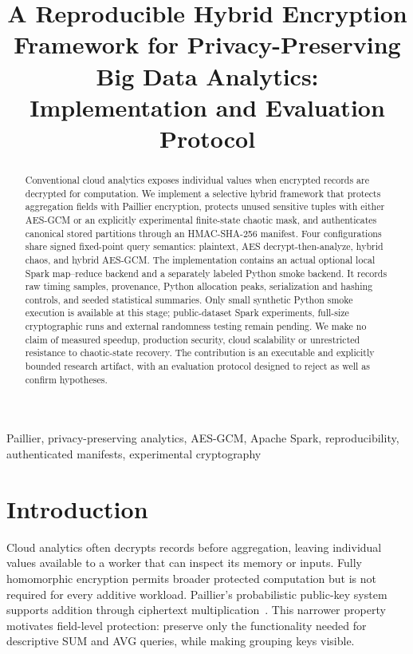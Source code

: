\documentclass[conference]{IEEEtran}
\title{A Reproducible Hybrid Encryption Framework for Privacy-Preserving Big Data Analytics: Implementation and Evaluation Protocol}
\author{\IEEEauthorblockN{Madhurjya Kakati and Gracy Sonwan}
\IEEEauthorblockA{Manipal University Jaipur\\Jaipur, Rajasthan, India}}
\begin{document}
\maketitle
\begin{abstract}
Conventional cloud analytics exposes individual values when encrypted records are decrypted for computation. We implement a selective hybrid framework that protects aggregation fields with Paillier encryption, protects unused sensitive tuples with either AES-GCM or an explicitly experimental finite-state chaotic mask, and authenticates canonical stored partitions through an HMAC-SHA-256 manifest. Four configurations share signed fixed-point query semantics: plaintext, AES decrypt-then-analyze, hybrid chaos, and hybrid AES-GCM. The implementation contains an actual optional local Spark map--reduce backend and a separately labeled Python smoke backend. It records raw timing samples, provenance, Python allocation peaks, serialization and hashing controls, and seeded statistical summaries. Only small synthetic Python smoke execution is available at this stage; public-dataset Spark experiments, full-size cryptographic runs and external randomness testing remain pending. We make no claim of measured speedup, production security, cloud scalability or unrestricted resistance to chaotic-state recovery. The contribution is an executable and explicitly bounded research artifact, with an evaluation protocol designed to reject as well as confirm hypotheses.
\end{abstract}
\begin{IEEEkeywords}
Paillier, privacy-preserving analytics, AES-GCM, Apache Spark, reproducibility, authenticated manifests, experimental cryptography
\end{IEEEkeywords}

\section{Introduction}
Cloud analytics often decrypts records before aggregation, leaving individual values available to a worker that can inspect its memory or inputs. Fully homomorphic encryption permits broader protected computation but is not required for every additive workload. Paillier's probabilistic public-key system supports addition through ciphertext multiplication~\cite{paillier}. This narrower property motivates field-level protection: preserve only the functionality needed for descriptive SUM and AVG queries, while making grouping keys visible.
\end{document}
